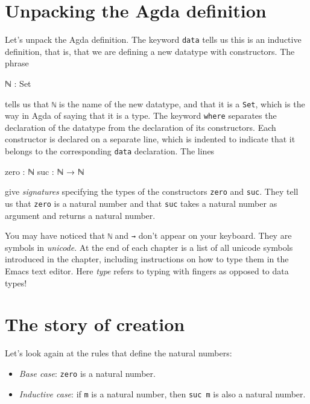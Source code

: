 \hypertarget{unpacking-the-agda-definition}{%
\section{Unpacking the Agda
definition}\label{unpacking-the-agda-definition}}

Let's unpack the Agda definition. The keyword \texttt{data} tells us
this is an inductive definition, that is, that we are defining a new
datatype with constructors. The phrase

\begin{myDisplay}
ℕ : Set
\end{myDisplay}

tells us that \texttt{ℕ} is the name of the new datatype, and that it is
a \texttt{Set}, which is the way in Agda of saying that it is a type.
The keyword \texttt{where} separates the declaration of the datatype
from the declaration of its constructors. Each constructor is declared
on a separate line, which is indented to indicate that it belongs to the
corresponding \texttt{data} declaration. The lines

\begin{myDisplay}
zero : ℕ
suc  : ℕ → ℕ
\end{myDisplay}

give \emph{signatures} specifying the types of the constructors
\texttt{zero} and \texttt{suc}. They tell us that \texttt{zero} is a
natural number and that \texttt{suc} takes a natural number as argument
and returns a natural number.

You may have noticed that \texttt{ℕ} and \texttt{→} don't appear on your
keyboard. They are symbols in \emph{unicode}. At the end of each chapter
is a list of all unicode symbols introduced in the chapter, including
instructions on how to type them in the Emacs text editor. Here
\emph{type} refers to typing with fingers as opposed to data types!

\hypertarget{the-story-of-creation}{%
\section{The story of creation}\label{the-story-of-creation}}

Let's look again at the rules that define the natural numbers:

\begin{itemize}
\tightlist
\item
  \emph{Base case}: \texttt{zero} is a natural number.
\item
  \emph{Inductive case}: if \texttt{m} is a natural number, then
  \texttt{suc\ m} is also a natural number.
\end{itemize}

